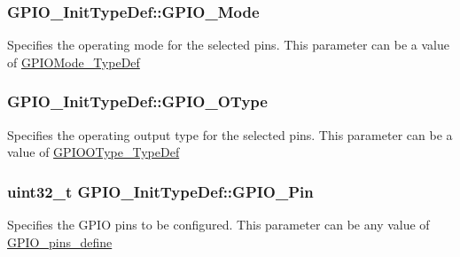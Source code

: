 \subsubsection[{\texorpdfstring{G\+P\+I\+O\+\_\+\+Mode}{GPIO_Mode}}]{ G\+P\+I\+O\+\_\+\+Init\+Type\+Def\+::\+G\+P\+I\+O\+\_\+\+Mode}\hypertarget{struct_g_p_i_o___init_type_def_a55bd77e335c2bfeec9caa5dc922b791b}{}\label{struct_g_p_i_o___init_type_def_a55bd77e335c2bfeec9caa5dc922b791b}
Specifies the operating mode for the selected pins. This parameter can be a value of \hyperlink{group___g_p_i_o_ga1347339e1c84a196fabbb31205eec5d4}{G\+P\+I\+O\+Mode\+\_\+\+Type\+Def} 
\subsubsection[{\texorpdfstring{G\+P\+I\+O\+\_\+\+O\+Type}{GPIO_OType}}]{ G\+P\+I\+O\+\_\+\+Init\+Type\+Def\+::\+G\+P\+I\+O\+\_\+\+O\+Type}\hypertarget{struct_g_p_i_o___init_type_def_af48c56f3e56e71204c8904ea29f5181b}{}\label{struct_g_p_i_o___init_type_def_af48c56f3e56e71204c8904ea29f5181b}
Specifies the operating output type for the selected pins. This parameter can be a value of \hyperlink{group___g_p_i_o_gae74212e8d66c389f47326b06bdf6d2ab}{G\+P\+I\+O\+O\+Type\+\_\+\+Type\+Def} 
\subsubsection[{\texorpdfstring{G\+P\+I\+O\+\_\+\+Pin}{GPIO_Pin}}]{\setlength{\rightskip}{0pt plus 5cm}uint32\+\_\+t G\+P\+I\+O\+\_\+\+Init\+Type\+Def\+::\+G\+P\+I\+O\+\_\+\+Pin}\hypertarget{struct_g_p_i_o___init_type_def_a0beb7bf54bbf5fff56f49d8beba2e3df}{}\label{struct_g_p_i_o___init_type_def_a0beb7bf54bbf5fff56f49d8beba2e3df}
Specifies the G\+P\+IO pins to be configured. This parameter can be any value of \hyperlink{group___g_p_i_o__pins__define}{G\+P\+I\+O\+\_\+pins\+\_\+define} 
